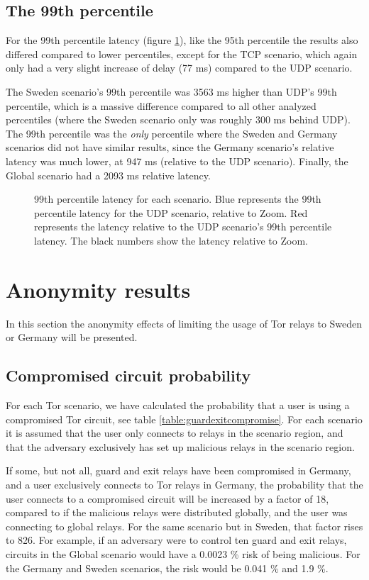 \documentclass{kththesis}
\begin{document}
\subsection{The 99th percentile}
For the 99th percentile latency (figure \ref{fig:99thPercentile}), like the 95th percentile the results also differed compared to lower percentiles, except for the TCP scenario, which again only had a very slight increase of delay (77 ms) compared to the UDP scenario. 

The Sweden scenario's 99th percentile was 3563 ms higher than UDP's 99th percentile, which is a massive difference compared to all other analyzed percentiles (where the Sweden scenario only was roughly 300 ms behind UDP). The 99th percentile was the \emph{only} percentile where the Sweden and Germany scenarios did not have similar results, since the Germany scenario's relative latency was much lower, at 947 ms (relative to the UDP scenario). Finally, the Global scenario had a 2093 ms relative latency.

\begin{figure}[!htb]
    \centering
    
    \caption{99th percentile latency for each scenario. Blue represents the 99th percentile latency for the UDP scenario, relative to Zoom. Red represents the latency relative to the UDP scenario's 99th percentile latency. The black numbers show the latency relative to Zoom.}
    \label{fig:99thPercentile}
\end{figure}

\section{Anonymity results}
In this section the anonymity effects of limiting the usage of Tor relays to Sweden or Germany will be presented.

\subsection{Compromised circuit probability}
For each Tor scenario, we have calculated the probability that a user is using a compromised Tor circuit, see table \ref{table:guardexitcompromise}. For each scenario it is assumed that the user only connects to relays in the scenario region, and that the adversary exclusively has set up malicious relays in the scenario region.

If some, but not all, guard and exit relays have been compromised in Germany, and a user exclusively connects to Tor relays in Germany, the probability that the user connects to a compromised circuit will be increased by a factor of 18, compared to if the malicious relays were distributed globally, and the user was connecting to global relays. For the same scenario but in Sweden, that factor rises to 826. For example, if an adversary were to control ten guard and exit relays, circuits in the Global scenario would have a 0.0023 \% risk of being malicious. For the Germany and Sweden scenarios, the risk would be 0.041 \% and 1.9 \%.
\end{document}
